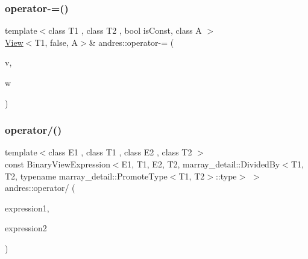 \mbox{\label{namespaceandres_a10a01738bed4f67459b210de091d3ea2}} 
\subsubsection{\texorpdfstring{operator-\/=()}{operator-=()}}
{\footnotesize\ttfamily template$<$class T1 , class T2 , bool is\+Const, class A $>$ \\
\hyperlink{classandres_1_1View}{View}$<$T1, false, A$>$\& andres\+::operator-\/= (\begin{DoxyParamCaption}\item[{\hyperlink{classandres_1_1View}{View}$<$ T1, false, A $>$ \&}]{v,  }\item[{const \hyperlink{classandres_1_1View}{View}$<$ T2, is\+Const, A $>$ \&}]{w }\end{DoxyParamCaption})\hspace{0.3cm}{\ttfamily [inline]}}

\mbox{\label{namespaceandres_ae804c627d02a5db6e2e16f020dfd1683}} 
\subsubsection{\texorpdfstring{operator/()}{operator/()}}
{\footnotesize\ttfamily template$<$class E1 , class T1 , class E2 , class T2 $>$ \\
const Binary\+View\+Expression$<$E1, T1, E2, T2, marray\+\_\+detail\+::\+Divided\+By$<$T1, T2, typename marray\+\_\+detail\+::\+Promote\+Type$<$T1, T2$>$\+::type$>$ $>$ andres\+::operator/ (\begin{DoxyParamCaption}\item[{const \hyperlink{classandres_1_1ViewExpression}{View\+Expression}$<$ E1, T1 $>$ \&}]{expression1,  }\item[{const \hyperlink{classandres_1_1ViewExpression}{View\+Expression}$<$ E2, T2 $>$ \&}]{expression2 }\end{DoxyParamCaption})\hspace{0.3cm}{\ttfamily [inline]}}

\mbox{\label{namespaceandres_af7defe3aacf03796d2490277f8446aa7}} 
